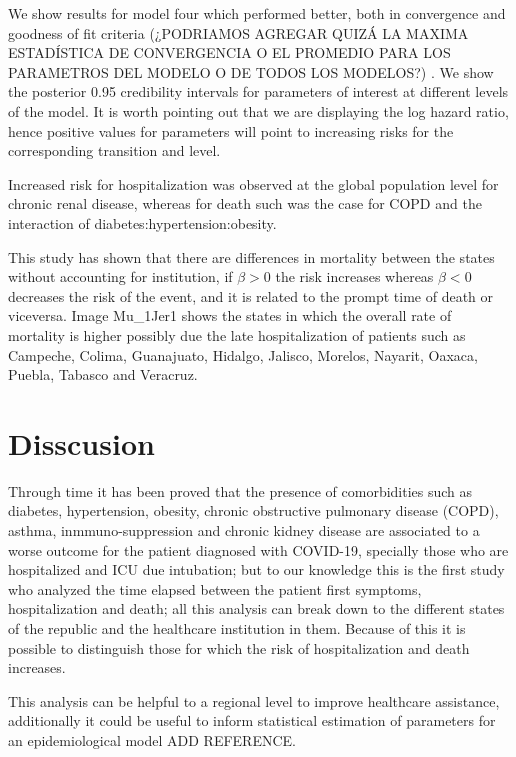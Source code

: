 \documentclass[
]{article}
\begin{document}
We show results for model four which performed better, both in
convergence and goodness of fit criteria (¿PODRIAMOS AGREGAR QUIZÁ LA
MAXIMA ESTADÍSTICA DE CONVERGENCIA O EL PROMEDIO PARA LOS PARAMETROS DEL
MODELO O DE TODOS LOS MODELOS?) . We show the posterior 0.95 credibility
intervals for parameters of interest at different levels of the model.
It is worth pointing out that we are displaying the log hazard ratio,
hence positive values for parameters will point to increasing risks for
the corresponding transition and level.

Increased risk for hospitalization was observed at the global population
level for chronic renal disease, whereas for death such was the case for
COPD and the interaction of diabetes:hypertension:obesity.

This study has shown that there are differences in mortality between the
states without accounting for institution, if \(\beta>0\) the risk
increases whereas \(\beta<0\) decreases the risk of the event, and it is
related to the prompt time of death or viceversa. Image Mu\_1Jer1 shows
the states in which the overall rate of mortality is higher possibly due
the late hospitalization of patients such as Campeche, Colima,
Guanajuato, Hidalgo, Jalisco, Morelos, Nayarit, Oaxaca, Puebla, Tabasco
and Veracruz.

\hypertarget{disscusion}{%
\section{Disscusion}\label{disscusion}}

Through time it has been proved that the presence of comorbidities such
as diabetes, hypertension, obesity, chronic obstructive pulmonary
disease (COPD), asthma, inmmuno-suppression and chronic kidney disease
are associated to a worse outcome for the patient diagnosed with
COVID-19, specially those who are hospitalized and ICU due intubation;
but to our knowledge this is the first study who analyzed the time
elapsed between the patient first symptoms, hospitalization and death;
all this analysis can break down to the different states of the republic
and the healthcare institution in them. Because of this it is possible
to distinguish those for which the risk of hospitalization and death
increases.

This analysis can be helpful to a regional level to improve healthcare
assistance, additionally it could be useful to inform statistical
estimation of parameters for an epidemiological model ADD REFERENCE.
\end{document}
